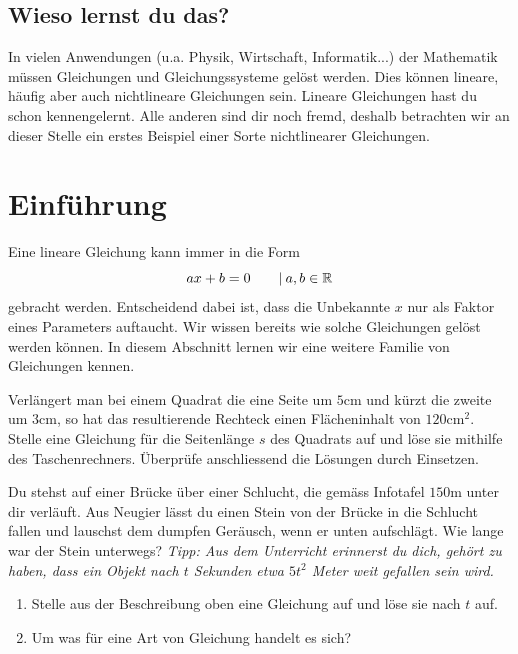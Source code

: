 \documentclass[11pt,oneside]{article}
\begin{document}
\subsection*{Wieso lernst du das?}
	In vielen Anwendungen (u.a. Physik, Wirtschaft, Informatik...) der Mathematik müssen Gleichungen und Gleichungssysteme gelöst werden. Dies können lineare, häufig aber auch nichtlineare Gleichungen sein. Lineare Gleichungen hast du schon kennengelernt.  Alle anderen sind dir noch fremd, deshalb betrachten wir an dieser Stelle ein erstes Beispiel einer Sorte nichtlinearer Gleichungen.

\newpage
\section{Einführung}
	Eine lineare Gleichung kann immer in die Form \[ax+b=0 \qquad\vert\:a,b\in\mathbb{R}\] gebracht werden. Entscheidend dabei ist, dass die Unbekannte $x$ nur als Faktor eines Parameters auftaucht. Wir wissen bereits wie solche Gleichungen gelöst werden können. In diesem Abschnitt lernen wir eine weitere Familie von Gleichungen kennen.
	\begin{aufgabe}
		Verlängert man bei einem Quadrat die eine Seite um $5$cm und kürzt die zweite um $3$cm, so hat das resultierende Rechteck einen Flächeninhalt von $120$cm$^2$. Stelle eine Gleichung für die Seitenlänge $s$ des Quadrats auf und löse sie mithilfe des Taschenrechners. Überprüfe anschliessend die Lösungen durch Einsetzen.\vspace{5pt}\newline
	\end{aufgabe}
	\begin{aufgabe}
		\label{aufg:fallenderStein}
		Du stehst auf einer Brücke über einer Schlucht, die gemäss Infotafel $150$m unter dir verläuft. Aus Neugier lässt du einen Stein von der Brücke in die Schlucht fallen und lauschst dem dumpfen Geräusch, wenn er unten aufschlägt. Wie lange war der Stein unterwegs?\newline
		\textit{Tipp: Aus dem Unterricht erinnerst du dich, gehört zu haben, dass ein Objekt nach $t$ Sekunden etwa $5t^2$ Meter weit gefallen sein wird.}
		\begin{enumerate}[label=\alph*)]
			\item Stelle aus der Beschreibung oben eine Gleichung auf und löse sie nach $t$ auf.
			\item Um was für eine Art von Gleichung handelt es sich?
		\end{enumerate}
		\karos{5}
	\end{aufgabe}
\end{document}
